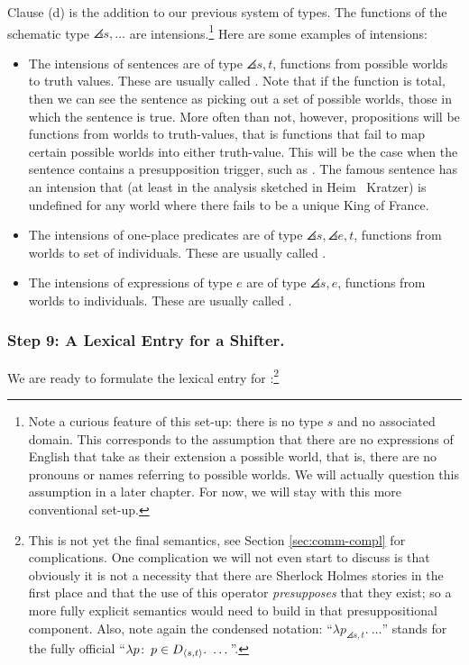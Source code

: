 Clause (d) is the addition to our previous system of types. The functions of the
schematic type $\angles{s,\dots}$ are intensions.\footnote{Note a curious
  feature of this set-up: there is no type $s$ and no associated domain. This
  corresponds to the assumption that there are no expressions of English that
  take as their extension a possible world, that is, there are no pronouns or
  names referring to possible worlds. We will actually question this assumption
  in a later chapter. For now, we will stay with this more conventional set-up.}
Here are some examples of intensions:

\begin{itemize}
\item The intensions of sentences are of type $\angles{s,t}$, functions from
  possible worlds to truth values. These are usually called .
  Note that if the function is total, then we can see the sentence as picking
  out a set of possible worlds, those in which the sentence is true. More often
  than not, however, propositions will be  functions from worlds
  to truth-values, that is functions that fail to map certain possible worlds
  into either truth-value. This will be the case when the sentence contains a
  presupposition trigger, such as . The famous sentence
   has an intension that (at least in the
  analysis sketched in Heim \amp\ Kratzer) is undefined for any world where
  there fails to be a unique King of France.
\item The intensions of one-place predicates are of type
  $\angles{s,\angles{e,t}}$, functions from worlds to set of individuals. These
  are usually called .
\item The intensions of expressions of type $e$ are of type $\angles{s,e}$,
  functions from worlds to individuals. These are usually called
  .
\end{itemize}

\subsubsection{Step 9: A Lexical Entry for a Shifter.} \label{sec:lexic-entry-expr}

We are ready to formulate the lexical entry for :\footnote{This is not yet the final semantics, see Section
  \ref{sec:comm-compl} for complications. One complication we will not even
  start to discuss is that obviously it is not a necessity that there are
  Sherlock Holmes stories in the first place and that the use of this operator
  \emph{presupposes} that they exist; so a more fully explicit semantics would
  need to build in that presuppositional component. Also, note again the
  condensed notation: ``$\lambda p_{\angles{s,t}}.\ \dots$'' stands for the
  fully official ``$\lambda p\colon\thinspace p \in D_{\langle s,t \rangle}.\ \dots$''.}

